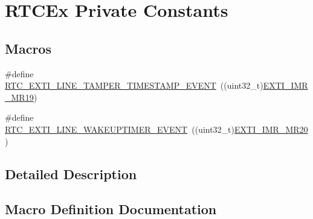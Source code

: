 \hypertarget{group___r_t_c_ex___private___constants}{}\section{R\+T\+C\+Ex Private Constants}
\label{group___r_t_c_ex___private___constants}
\subsection*{Macros}
\begin{DoxyCompactItemize}
\item 
\#define \hyperlink{group___r_t_c_ex___private___constants_gaffa3448885f1dec216899aef7f49471f}{R\+T\+C\+\_\+\+E\+X\+T\+I\+\_\+\+L\+I\+N\+E\+\_\+\+T\+A\+M\+P\+E\+R\+\_\+\+T\+I\+M\+E\+S\+T\+A\+M\+P\+\_\+\+E\+V\+E\+NT}~((uint32\+\_\+t)\hyperlink{group___peripheral___registers___bits___definition_gad47f7a023cbba165dfb95845d3c8c55c}{E\+X\+T\+I\+\_\+\+I\+M\+R\+\_\+\+M\+R19})
\item 
\#define \hyperlink{group___r_t_c_ex___private___constants_ga1a1a58e244663850786c387bfa5474f2}{R\+T\+C\+\_\+\+E\+X\+T\+I\+\_\+\+L\+I\+N\+E\+\_\+\+W\+A\+K\+E\+U\+P\+T\+I\+M\+E\+R\+\_\+\+E\+V\+E\+NT}~((uint32\+\_\+t)\hyperlink{group___peripheral___registers___bits___definition_ga4aee679baf5820e1666b60e48a64cafa}{E\+X\+T\+I\+\_\+\+I\+M\+R\+\_\+\+M\+R20})
\end{DoxyCompactItemize}


\subsection{Detailed Description}


\subsection{Macro Definition Documentation}
\mbox{\label{group___r_t_c_ex___private___constants_gaffa3448885f1dec216899aef7f49471f}} 
